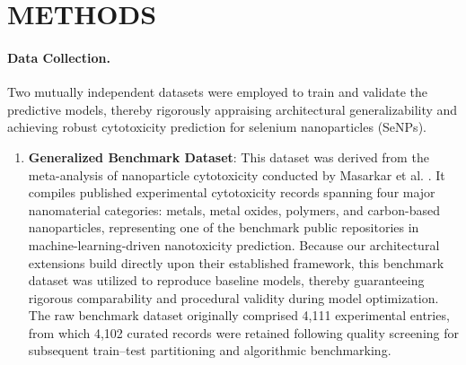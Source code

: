 \section{METHODS}

\paragraph{Data Collection.}
Two mutually independent datasets were employed to train and validate the predictive models, thereby rigorously appraising architectural generalizability and achieving robust cytotoxicity prediction for selenium nanoparticles (SeNPs).

\begin{enumerate}
  \item \textbf{Generalized Benchmark Dataset}:
This dataset was derived from the meta-analysis of nanoparticle cytotoxicity conducted by Masarkar et al. \cite{masarkar2024}.
It compiles published experimental cytotoxicity records spanning four major nanomaterial categories: metals, metal oxides, polymers, and carbon-based nanoparticles, representing one of the benchmark public repositories in machine-learning-driven nanotoxicity prediction.
Because our architectural extensions build directly upon their established framework, this benchmark dataset was utilized to reproduce baseline models, thereby guaranteeing rigorous comparability and procedural validity during model optimization.
The raw benchmark dataset originally comprised 4,111 experimental entries, from which 4,102 curated records were retained following quality screening for subsequent train--test partitioning and algorithmic benchmarking.


\end{enumerate}
